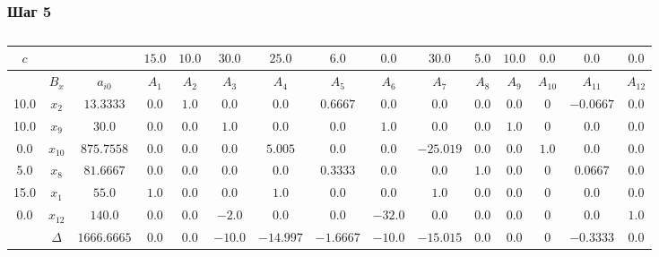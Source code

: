 \begin{landscape}

\subsubsection{Шаг 5}

\begin{table}[H]
	\centering
	\normalsize
	\caption{}
	\label{tbl:1}
	\begin{tabular}{|c|c|c|c|c|c|c|c|c|c|c|c|c|c|c|}
		\hline
		$c$&&&$15.0$&$10.0$&$30.0$&$25.0$&$6.0$&$0.0$&$30.0$&$5.0$&$10.0$&$0.0$&$0.0$&$0.0$\\ \hline
		&$B_x$&$a_{i0}$&$A_{1}$&$A_{2}$&$A_{3}$&$A_{4}$&$A_{5}$&$A_{6}$&$A_{7}$&$A_{8}$&$A_{9}$&$A_{10}$&$A_{11}$&$A_{12}$\\ \hline
		10.0&$x_{2}$&$13.3333$&$0.0$&$1.0$&$0.0$&$0.0$&$0.6667$&$0.0$&$0.0$&$0.0$&$0.0$&$0$&$-0.0667$&$0.0$\\ \hline
		10.0&$x_{9}$&$30.0$&$0.0$&$0.0$&$1.0$&$0.0$&$0.0$&$1.0$&$0.0$&$0.0$&$1.0$&$0$&$0.0$&$0.0$\\ \hline
		0.0&$x_{10}$&$875.7558$&$0.0$&$0.0$&$0.0$&$5.005$&$0.0$&$0.0$&$-25.019$&$0.0$&$0.0$&$1.0$&$0.0$&$0.0$\\ \hline
		5.0&$x_{8}$&$81.6667$&$0.0$&$0.0$&$0.0$&$0.0$&$0.3333$&$0.0$&$0.0$&$1.0$&$0.0$&$0$&$0.0667$&$0.0$\\ \hline
		15.0&$x_{1}$&$55.0$&$1.0$&$0.0$&$0.0$&$1.0$&$0.0$&$0.0$&$1.0$&$0.0$&$0.0$&$0$&$0.0$&$0.0$\\ \hline
		0.0&$x_{12}$&$140.0$&$0.0$&$0.0$&$-2.0$&$0.0$&$0.0$&$-32.0$&$0.0$&$0.0$&$0.0$&$0$&$0.0$&$1.0$\\ \hline
		&$\Delta$&$1666.6665$&$0.0$&$0.0$&$-10.0$&$-14.997$&$-1.6667$&$-10.0$&$-15.015$&$0.0$&$0.0$&$0$&$-0.3333$&$0.0$\\ \hline

\end{tabular}

\end{table}

\end{landscape}

